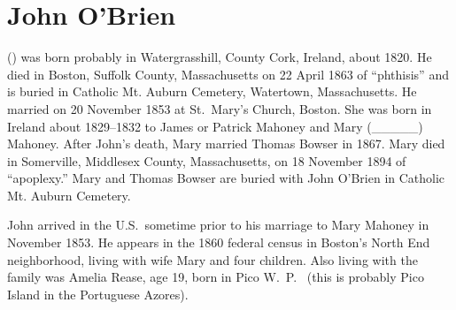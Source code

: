 \section{John O'Brien}\label{per:John2OBrien}

 () was born probably in Watergrasshill, County Cork, Ireland, about 1820.\cite{John2OBrienMarriage:1} He died in Boston, Suffolk County, Massachusetts on 22 April 1863 of ``phthisis'' \cite{John2OBrienDeath:2} and is buried in Catholic Mt. Auburn Cemetery, Watertown, Massachusetts.\cite{BillMcEvoy:1} He married  on 20 November 1853 at St.\ Mary's Church, Boston.\cite{John2OBrienMarriage:3} She was born in Ireland about 1829--1832 to James or Patrick Mahoney and Mary (\_\_\_\_\_) Mahoney.\cite{John2OBrienCivilMarriage:1,MaryMahoneyBowserMarriage:1} After John's death, Mary married Thomas Bowser in 1867.\cite{MaryMahoneyBowserMarriage:2} Mary died in Somerville, Middlesex County, Massachusetts, on 18 November 1894 of ``apoplexy.''\cite{MaryMahoneyDeath} Mary and Thomas Bowser are buried with John O'Brien in Catholic Mt. Auburn Cemetery.\cite{BillMcEvoy:2}

John arrived in the U.S.\ sometime prior to his marriage to Mary Mahoney in November 1853. He appears in the 1860 federal census in Boston's North End neighborhood, living with wife Mary and four children. Also living with the family was Amelia Rease, age 19, born in Pico W.\ P.\ \cite{Census1860John} (this is probably Pico Island in the Portuguese Azores). 

